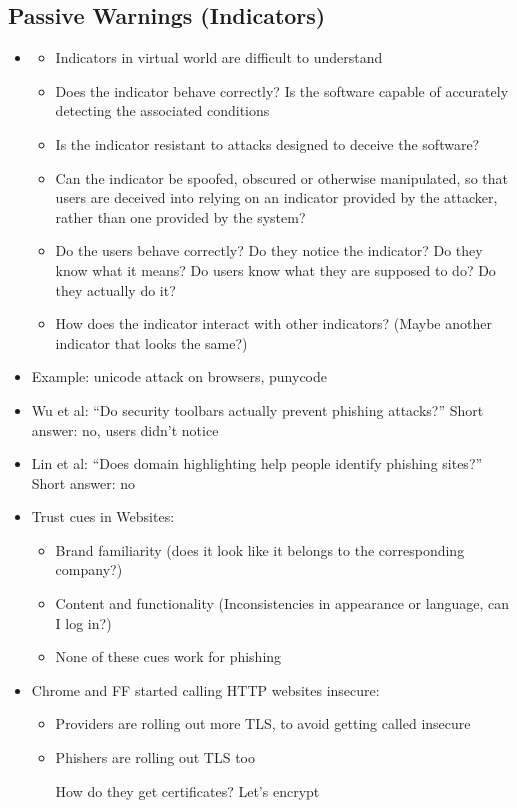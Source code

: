 \documentclass[a4paper,12pt]{scrartcl}
\begin{document}
\subsection{Passive Warnings (Indicators)}
\begin{itemize}
	\item
		\begin{itemize}
			\item
				Indicators in virtual world are difficult to understand
			\item
				Does the indicator behave correctly? Is the software capable of accurately detecting the associated conditions
			\item
				Is the indicator resistant to attacks designed to deceive the software?
			\item
				Can the indicator be spoofed, obscured or otherwise manipulated, so that users are deceived into relying on an indicator provided by the attacker, rather than one provided by the system?
			\item
				Do the users behave correctly? Do they notice the indicator? Do they know what it means? Do users know what they are supposed to do? Do they actually do it?
			\item How does the indicator interact with other indicators? (Maybe another indicator that looks the same?)
		\end{itemize}
	\item
		Example: unicode attack on browsers, punycode
	\item
		Wu et al: \enquote{Do security toolbars actually prevent phishing attacks?} Short answer: no, users didn't notice
	\item
		Lin et al: \enquote{Does domain highlighting help people identify phishing sites?} Short answer: no
	\item
		Trust cues in Websites:
		\begin{itemize}
			\item
				Brand familiarity (does it look like it belongs to the corresponding company?)
			\item
				Content and functionality (Inconsistencies in appearance or language, can I log in?)
			\item
				None of these cues work for phishing
		\end{itemize}
	\item
		Chrome and FF started calling HTTP websites insecure:
		\begin{itemize}
			\item
				Providers are rolling out more TLS, to avoid getting called insecure
			\item
				Phishers are rolling out TLS too

				How do they get certificates? Let's encrypt
		\end{itemize}
\end{itemize}
\end{document}

